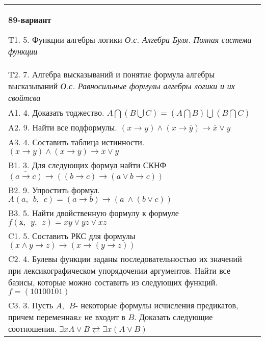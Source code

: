 \documentclass{article}
\begin{document}
\begin{tabular}{m{17cm}}
\textbf{89-вариант}
\newline

T1. 5. Функции алгебры логики \emph{О.с. Алгебра Буля. Полная система функции} \\
T2. 7. Алгебра высказываний и понятие формула алгебры высказываний \emph{О.с. Равносильные формулы алгебры логики и их свойтсва} \\
A1. 4. Доказать тоджество. \(A\bigcap(B\bigcup C) = (A\bigcap B)\bigcup(B\bigcap C)\) \\
A2. 9. Найти все подформулы. \((x \rightarrow y) \land (x \rightarrow \overline{y}) \rightarrow \overline{x} \vee y\) \\
A3. 4. Составить таблица истинности. \((x \rightarrow y) \land (x \rightarrow \overline{y}) \rightarrow \overline{x} \vee y\) \\
B1. 3. Для следующих формул найти СКНФ \(\overline{(a \rightarrow c)} \rightarrow \left( (b \rightarrow c) \rightarrow (a \vee b \rightarrow c) \right)\) \\
B2. 9. Упростить формул. \(A(a,\ \ b,\ \ c) = (a \rightarrow b) \rightarrow (\overline{a}\  \land (b \vee c))\) \\
B3. 5. Найти двойственную формулу к формуле \(f(х,\ \ y,\ \ z) = xy \vee yz \vee xz\) \\
C1. 5. Составить РКС для формулы \((x \land y \rightarrow z) \rightarrow (x \rightarrow (y \rightarrow z))\) \\
C2. 4. Булевы функции заданы последовательностью их значений при лексикографическом упорядочении аргументов. Найти все базисы, которые можно составить из следующих функций. \(f = (10100101)\) \\
C3. 3. Пусть \(A,\ \ B\)- некоторые формулы исчисления предикатов, причем переменная\(x\) не входит в \(B\). Доказать следующие соотношения. \(\exists xA \vee B \rightleftarrows \exists x(A \vee B)\) \\

\end{tabular}
\vspace{1cm}
\end{document}
